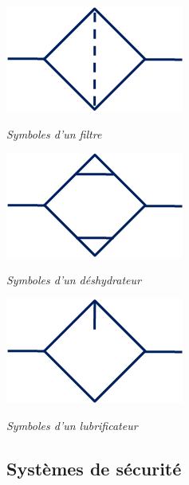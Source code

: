 \documentclass[10pt]{article}
\begin{document}
\begin{minipage}[c]{.3\textwidth}
\begin{center}
\includegraphics[width=.3\textwidth]{images/Symb_Filtre}

\textit{Symboles d'un filtre}
\end{center}
\end{minipage} \hfill
\begin{minipage}[c]{.3\textwidth}
\begin{center}
\includegraphics[width=.3\textwidth]{images/Symb_Deshydrateur}

\textit{Symboles d'un déshydrateur}
\end{center}
\end{minipage} \hfill
\begin{minipage}[c]{.3\textwidth}
\begin{center}
\includegraphics[width=.3\textwidth]{images/Symb_Lubrificateur}

\textit{Symboles d'un lubrificateur}
\end{center}
\end{minipage} 



\subsection{Systèmes de sécurité}
\end{document}
